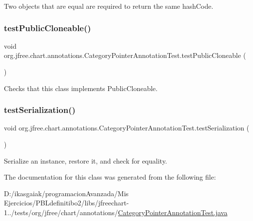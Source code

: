 Two objects that are equal are required to return the same hash\+Code. \mbox{\label{classorg_1_1jfree_1_1chart_1_1annotations_1_1_category_pointer_annotation_test_af3571686712daebfb022b36b898498cf}} 
\subsubsection{\texorpdfstring{test\+Public\+Cloneable()}{testPublicCloneable()}}
{\footnotesize\ttfamily void org.\+jfree.\+chart.\+annotations.\+Category\+Pointer\+Annotation\+Test.\+test\+Public\+Cloneable (\begin{DoxyParamCaption}{ }\end{DoxyParamCaption})}

Checks that this class implements Public\+Cloneable. \mbox{\label{classorg_1_1jfree_1_1chart_1_1annotations_1_1_category_pointer_annotation_test_ac9cebc5205858f5fac7a6591e618c1f8}} 
\subsubsection{\texorpdfstring{test\+Serialization()}{testSerialization()}}
{\footnotesize\ttfamily void org.\+jfree.\+chart.\+annotations.\+Category\+Pointer\+Annotation\+Test.\+test\+Serialization (\begin{DoxyParamCaption}{ }\end{DoxyParamCaption})}

Serialize an instance, restore it, and check for equality. 

The documentation for this class was generated from the following file\+:\begin{DoxyCompactItemize}
\item 
D\+:/ikasgaiak/programacion\+Avanzada/\+Mis Ejercicios/\+P\+B\+Ldefinitibo2/libs/jfreechart-\/1../tests/org/jfree/chart/annotations/\mbox{\hyperlink{_category_pointer_annotation_test_8java}{Category\+Pointer\+Annotation\+Test.\+java}}\end{DoxyCompactItemize}
